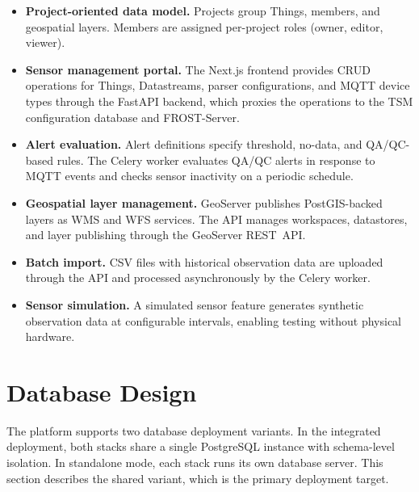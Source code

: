 \begin{itemize}
  \item \textbf{Project-oriented data model.} Projects group Things, members, and
        geospatial layers. Members are assigned per-project roles (owner, editor, viewer).
  \item \textbf{Sensor management portal.} The Next.js frontend provides CRUD operations
        for Things, Datastreams, parser configurations, and MQTT device types through
        the FastAPI backend, which proxies the operations to the TSM configuration
        database and FROST-Server.
  \item \textbf{Alert evaluation.} Alert definitions specify threshold, no-data, and
        QA/QC-based rules. The Celery worker evaluates QA/QC alerts in response to MQTT
        events and checks sensor inactivity on a periodic schedule.
  \item \textbf{Geospatial layer management.} GeoServer publishes PostGIS-backed layers
        as WMS and WFS services. The API manages workspaces, datastores, and layer
        publishing through the GeoServer REST~API.
  \item \textbf{Batch import.} CSV files with historical observation data are uploaded
        through the API and processed asynchronously by the Celery worker.
  \item \textbf{Sensor simulation.} A simulated sensor feature generates synthetic
        observation data at configurable intervals, enabling testing without physical
        hardware.
\end{itemize}


\section{Database Design}
\label{sec:arch-database}

The platform supports two database deployment variants. In the integrated deployment,
both stacks share a single PostgreSQL instance with schema-level
isolation. In standalone mode, each stack runs its own database server. This section describes
the shared variant, which is the primary deployment target.

